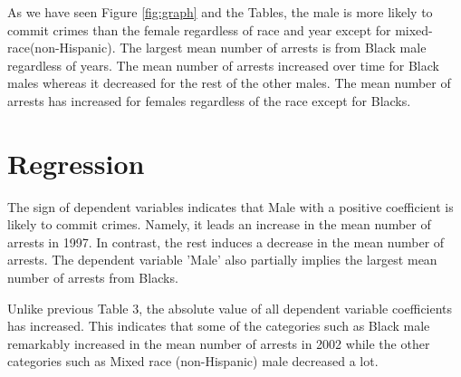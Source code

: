 \documentclass{article}
\begin{document}


As we have seen Figure \ref{fig:graph} and the Tables, the male is more likely to commit crimes than the female regardless of race and year except for mixed-race(non-Hispanic). The largest mean number of arrests is from Black male regardless of years. The mean number of arrests increased over time for Black males whereas it decreased for the rest of the other males. The mean number of arrests has increased for females regardless of the race except for Blacks.
\section{Regression}





The sign of dependent variables indicates that Male with a positive coefficient is likely to commit crimes. Namely, it leads an increase in the mean number of arrests in 1997. In contrast, the rest induces a decrease in the mean number of arrests. The dependent variable 'Male' also partially implies the largest mean number of arrests from Blacks.

\newpage


Unlike previous Table 3, the absolute value of all dependent variable coefficients has increased. This indicates that some of the categories such as Black male remarkably increased in the mean number of arrests in 2002 while the other categories such as Mixed race (non-Hispanic) male decreased a lot. 
\end{document}
